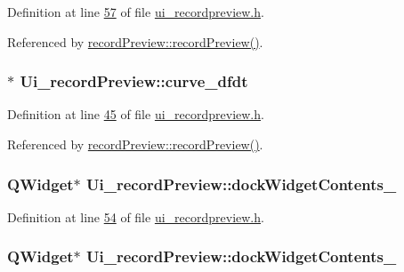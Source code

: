 Definition at line \hyperlink{a00140_source_l00057}{57} of file \hyperlink{a00140_source}{ui\+\_\+recordpreview.\+h}.



Referenced by \hyperlink{a00129_source_l00011}{record\+Preview\+::record\+Preview()}.

\hypertarget{a00081_a43d24fa14d90cc27b310542e39dcdd1b}{
\subsubsection[{curve\+\_\+dfdt}]{$\ast$ Ui\+\_\+record\+Preview\+::curve\+\_\+dfdt}}\label{a00081_a43d24fa14d90cc27b310542e39dcdd1b}


Definition at line \hyperlink{a00140_source_l00045}{45} of file \hyperlink{a00140_source}{ui\+\_\+recordpreview.\+h}.



Referenced by \hyperlink{a00129_source_l00052}{record\+Preview\+::record\+Preview()}.

\hypertarget{a00081_a26b0f4ae45c1aa0cfd8037f25a2f290f}{
\subsubsection[{dock\+Widget\+Contents\+\_\+3}]{\setlength{\rightskip}{0pt plus 5cm}Q\+Widget$\ast$ Ui\+\_\+record\+Preview\+::dock\+Widget\+Contents\+\_}}\label{a00081_a26b0f4ae45c1aa0cfd8037f25a2f290f}


Definition at line \hyperlink{a00140_source_l00054}{54} of file \hyperlink{a00140_source}{ui\+\_\+recordpreview.\+h}.

\hypertarget{a00081_a538c2b98d6f228a073dea0a3ddb4350e}{
\subsubsection[{dock\+Widget\+Contents\+\_\+4}]{\setlength{\rightskip}{0pt plus 5cm}Q\+Widget$\ast$ Ui\+\_\+record\+Preview\+::dock\+Widget\+Contents\+\_}}\label{a00081_a538c2b98d6f228a073dea0a3ddb4350e}


